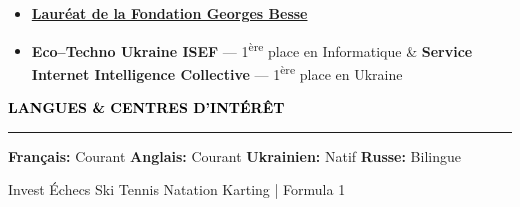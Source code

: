\documentclass[10pt,english,french]{article}
\newcommand{\chessIcon}[1][black]{\textcolor{#1}{\faChess}}
\newcommand{\skiIcon}[1][black]{\textcolor{#1}{\faSkiing}}
\newcommand{\cryptoIcon}[1][black]{\textcolor{#1}{\faBitcoin}}
\newcommand{\swimmingIcon}[1][black]{\textcolor{#1}{\faSwimmer}}
\newcommand{\mountainsIcon}[1][black]{\textcolor{#1}{\faMountain}}
\newcommand{\speechBubbleIcon}[1][black]{\textcolor{#1}{\faComment}}
\newcommand{\tradingIcon}[1][black]{\textcolor{#1}{\faChartBar}}
\newcommand{\tennisIcon}[1][black]{\textcolor{#1}{\faBaseballBall}}
\newcommand{\flagIcon}[1][black]{\textcolor{#1}{\faFlagCheckered}}
\newlength{\mpwidth}
\newcommand{\cvsection}[1]{
    \vspace{4pt}
    \textbf{\fontsize{9pt}{10pt}\selectfont \textcolor{black}{#1}}
    \vspace{6pt}
    \hrule
    \vspace{6pt}
}
\newcommand{\cvtextnotab}[1]{
    \parbox{1\mpwidth}{#1}
}
\begin{document}
\vspace{-6pt}
\begin{itemize}[leftmargin=0.35cm, label=\textbullet, itemsep=0.15em]
    \item \textbf{\href{https://www.fondationbesse.com/}{Lauréat de la Fondation Georges Besse}}
    \item \textbf{Eco\hspace{3pt}--\hspace{3pt}Techno Ukraine ISEF} --- 1\textsuperscript{ère} place en Informatique \& \textbf{Service Internet Intelligence Collective} --- 1\textsuperscript{ère} place en Ukraine
\end{itemize}

\vspace{-3pt}
\cvsection{\speechBubbleIcon[black]\hspace{4pt}LANGUES \& CENTRES D'INTÉRÊT}

\vspace{-3pt}
\cvtextnotab{\textbf{Français\!:} Courant \hspace{12pt} \textbf{Anglais\!:} Courant \hspace{12pt} \textbf{Ukrainien\!:} Natif \hspace{20pt} \textbf{Russe\!:} Bilingue}

\vspace{-8pt}
\cvtextnotab{
    \tradingIcon[black]\hspace{2pt}Invest \hspace{12pt}
    \chessIcon[black]\hspace{2pt}Échecs \hspace{12pt}
    \skiIcon[black]\hspace{2pt}Ski \hspace{12pt}
    \tennisIcon[black]\hspace{2pt}Tennis \hspace{12pt}
    \swimmingIcon[black]\hspace{2pt}Natation \hspace{12pt}
    \flagIcon[black]\hspace{2pt}Karting | Formula 1
}
\end{document}

